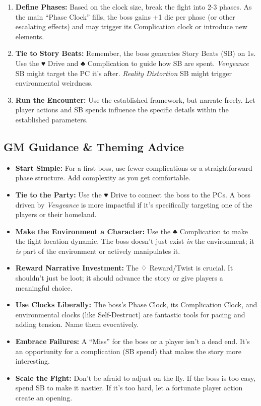 \begin{enumerate}
\begin{itemize}
    \end{itemize}
    \item \textbf{Define Phases:} Based on the clock size, break the fight into 2-3 phases. As the main ``Phase Clock'' fills, the boss gains +1 die per phase (or other escalating effects) and may trigger its Complication clock or introduce new elements.
    \item \textbf{Tie to Story Beats:} Remember, the boss generates Story Beats (SB) on 1s. Use the ♥ Drive and ♣ Complication to guide how SB are spent. \emph{Vengeance} SB might target the PC it's after. \emph{Reality Distortion} SB might trigger environmental weirdness.
    \item \textbf{Run the Encounter:} Use the established framework, but narrate freely. Let player actions and SB spends influence the specific details within the established parameters.
\end{enumerate}

\subsection{GM Guidance \& Theming Advice}

\begin{itemize}
    \item \textbf{Start Simple:} For a first boss, use fewer complications or a straightforward phase structure. Add complexity as you get comfortable.
    \item \textbf{Tie to the Party:} Use the ♥ Drive to connect the boss to the PCs. A boss driven by \emph{Vengeance} is more impactful if it's specifically targeting one of the players or their homeland.
    \item \textbf{Make the Environment a Character:} Use the ♣ Complication to make the fight location dynamic. The boss doesn't just exist \emph{in} the environment; it \emph{is} part of the environment or actively manipulates it.
    \item \textbf{Reward Narrative Investment:} The ♢ Reward/Twist is crucial. It shouldn't just be loot; it should advance the story or give players a meaningful choice.
    \item \textbf{Use Clocks Liberally:} The boss's Phase Clock, its Complication Clock, and environmental clocks (like Self-Destruct) are fantastic tools for pacing and adding tension. Name them evocatively.
    \item \textbf{Embrace Failures:} A ``Miss'' for the boss or a player isn't a dead end. It's an opportunity for a complication (SB spend) that makes the story more interesting.
    \item \textbf{Scale the Fight:} Don't be afraid to adjust on the fly. If the boss is too easy, spend SB to make it nastier. If it's too hard, let a fortunate player action create an opening.
\end{itemize}

